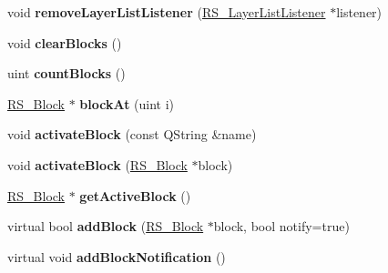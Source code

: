 \begin{DoxyCompactItemize}
\item 
\hypertarget{classRS__Graphic_a06ca84adae4763591c26cd5c1261c02a}{void {\bfseries remove\-Layer\-List\-Listener} (\hyperlink{classRS__LayerListListener}{R\-S\-\_\-\-Layer\-List\-Listener} $\ast$listener)}\label{classRS__Graphic_a06ca84adae4763591c26cd5c1261c02a}

\item 
\hypertarget{classRS__Graphic_acba61ebb919074d16bdb01f51a75e4d5}{void {\bfseries clear\-Blocks} ()}\label{classRS__Graphic_acba61ebb919074d16bdb01f51a75e4d5}

\item 
\hypertarget{classRS__Graphic_abc78877ab3bd5b652ed8c712764f5b9f}{uint {\bfseries count\-Blocks} ()}\label{classRS__Graphic_abc78877ab3bd5b652ed8c712764f5b9f}

\item 
\hypertarget{classRS__Graphic_a361ed77f9945be4b601b70c5b1f5d421}{\hyperlink{classRS__Block}{R\-S\-\_\-\-Block} $\ast$ {\bfseries block\-At} (uint i)}\label{classRS__Graphic_a361ed77f9945be4b601b70c5b1f5d421}

\item 
\hypertarget{classRS__Graphic_a225b7902ec7aecbf4d5c1a4db9fbd7d2}{void {\bfseries activate\-Block} (const Q\-String \&name)}\label{classRS__Graphic_a225b7902ec7aecbf4d5c1a4db9fbd7d2}

\item 
\hypertarget{classRS__Graphic_a705de3e5e11606c59562e9caa1df09eb}{void {\bfseries activate\-Block} (\hyperlink{classRS__Block}{R\-S\-\_\-\-Block} $\ast$block)}\label{classRS__Graphic_a705de3e5e11606c59562e9caa1df09eb}

\item 
\hypertarget{classRS__Graphic_a9a41bf45834e70faf294d47f1742ebe9}{\hyperlink{classRS__Block}{R\-S\-\_\-\-Block} $\ast$ {\bfseries get\-Active\-Block} ()}\label{classRS__Graphic_a9a41bf45834e70faf294d47f1742ebe9}

\item 
\hypertarget{classRS__Graphic_ab70100e42b97e87a2c032c984a8c48d0}{virtual bool {\bfseries add\-Block} (\hyperlink{classRS__Block}{R\-S\-\_\-\-Block} $\ast$block, bool notify=true)}\label{classRS__Graphic_ab70100e42b97e87a2c032c984a8c48d0}

\item 
\hypertarget{classRS__Graphic_a243ac01d7424fc3c77d309bcaf25c417}{virtual void {\bfseries add\-Block\-Notification} ()}\label{classRS__Graphic_a243ac01d7424fc3c77d309bcaf25c417}


\end{DoxyCompactItemize}
